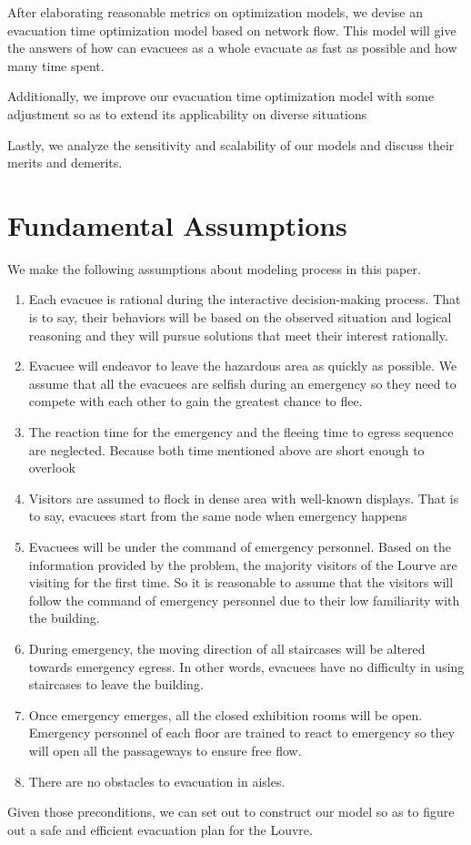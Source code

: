 \documentclass{mcmthesis}
\begin{document}
	After elaborating reasonable metrics on optimization models, we devise an evacuation time optimization model based on network flow. This model will give the answers of how can evacuees as a whole evacuate as fast as possible and how many time spent. 
	
	Additionally, we improve our evacuation time optimization model with some adjustment  so as to extend its applicability on diverse situations
	
	Lastly, we analyze the sensitivity and scalability of our models and discuss their merits and demerits.
	
	
	
	
	\section{Fundamental  Assumptions}
	We make the following assumptions about modeling process in this paper.
	\begin{enumerate}[1.]
		\item  Each evacuee is rational during the interactive decision-making process. That is to say, their behaviors will be based on the observed situation and logical reasoning and they will pursue solutions that meet their interest rationally.
		\item Evacuee will endeavor to leave the hazardous area as quickly as possible. We assume that  all the evacuees are selfish during an emergency so they need to compete with each other to gain the greatest chance to flee.
		\item The reaction time for the emergency and the fleeing time to egress sequence are neglected. Because both time mentioned above are short enough to overlook
		\item Visitors are assumed to flock in dense area with well-known displays. That is to say, evacuees start from the same node when emergency happens
		\item Evacuees will be under the command of emergency personnel. Based on the information provided by the problem, the majority visitors of the Lourve are visiting for the first time. So it is reasonable to assume that the visitors will follow the command of emergency personnel due to their low familiarity with the building.
		\item During emergency, the moving direction of all staircases will be altered towards emergency egress. In other words, evacuees have no difficulty in using staircases to leave the building.
		\item Once emergency emerges, all the closed exhibition rooms will be open. Emergency personnel of each floor are trained to react to emergency so they will open all the passageways to ensure free flow.
		\item There are no obstacles to evacuation in aisles.
	\end{enumerate}
	Given those preconditions, we can set out to construct our model so as to figure out a safe and efficient evacuation plan for the Louvre.
	
\end{document}
